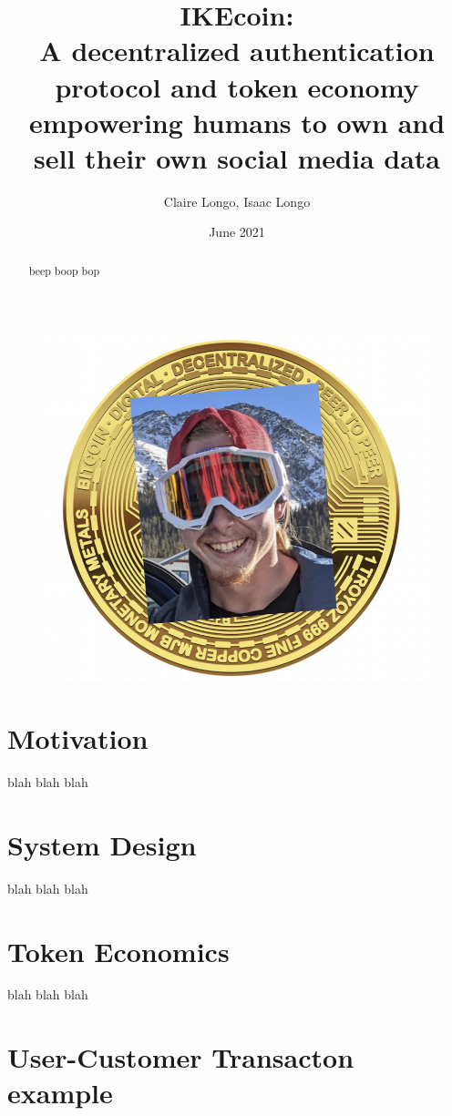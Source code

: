 \documentclass[12pt, letterpaper, twoside]{article}
\title{\color{cyan}IKEcoin: \\ 
\large A decentralized authentication protocol and token economy empowering humans to own and sell their own social media data}
\author{Claire Longo, Isaac Longo}
\date{June 2021}
\begin{document}
\maketitle

\begin{figure}[h]
  \includegraphics[scale=0.5]{media/IKEcoin.jpg}
  \centering
\end{figure}

\begin{abstract}
  \noindent
  beep boop bop
\end{abstract}


\section{Motivation}
blah blah blah

\section{System Design}
blah blah blah


\section{Token Economics}
blah blah blah


\section{User-Customer Transacton example}
\end{document}
